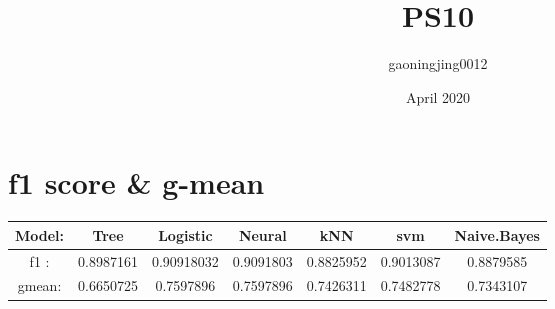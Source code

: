 \documentclass{article}
\title{PS10}
\author{gaoningjing0012 }
\date{April 2020}
\begin{document}
\maketitle
\section{f1 score & g-mean}
\begin{center}
 \begin{tabular}{||c c c c c c c||} 
 \hline
  Model: & Tree & Logistic & Neural & kNN & svm & Naive.Bayes\\ 
 \hline\hline
f1 : & 0.8987161 & 0.90918032 & 0.9091803 & 0.8825952 & 0.9013087 & 0.8879585\\ 
 \hline
gmean: & 0.6650725  &  0.7597896 & 0.7597896 & 0.7426311 & 0.7482778 & 0.7343107\\ 
 \hline
\end{tabular}
\end{center}
\end{document}
